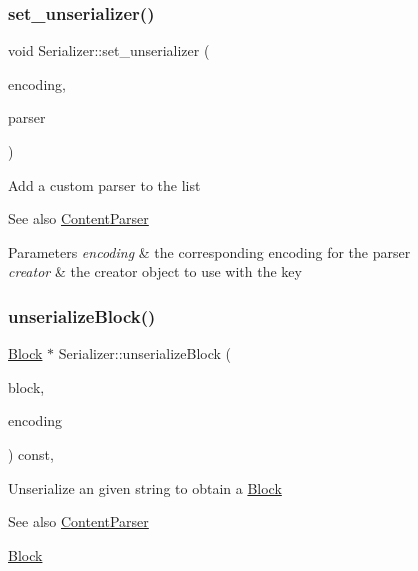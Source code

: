 \subsubsection{\texorpdfstring{set\+\_\+unserializer()}{set\_unserializer()}}
{\footnotesize\ttfamily void Serializer\+::set\+\_\+unserializer (\begin{DoxyParamCaption}\item[{const char $\ast$}]{encoding,  }\item[{\mbox{\hyperlink{classContentParser}{Content\+Parser}} $\ast$}]{parser }\end{DoxyParamCaption})\hspace{0.3cm}{\ttfamily [inherited]}}

Add a custom parser to the list \begin{DoxySeeAlso}{See also}
\mbox{\hyperlink{classContentParser}{Content\+Parser}}
\end{DoxySeeAlso}

\begin{DoxyParams}{Parameters}
{\em encoding} & the corresponding encoding for the parser \\
\hline
{\em creator} & the creator object to use with the key \\
\hline
\end{DoxyParams}
\mbox{\label{classSerializer_a423fb7c43ca9c23e07000dba0c5a432a}} 
\subsubsection{\texorpdfstring{unserialize\+Block()}{unserializeBlock()}}
{\footnotesize\ttfamily \mbox{\hyperlink{classBlock}{Block}} $\ast$ Serializer\+::unserialize\+Block (\begin{DoxyParamCaption}\item[{std\+::string}]{block,  }\item[{const char $\ast$}]{encoding }\end{DoxyParamCaption}) const\hspace{0.3cm}{\ttfamily [virtual]}, {\ttfamily [inherited]}}

Unserialize an given string to obtain a \mbox{\hyperlink{classBlock}{Block}} \begin{DoxySeeAlso}{See also}
\mbox{\hyperlink{classContentParser}{Content\+Parser}} 

\mbox{\hyperlink{classBlock}{Block}}
\end{DoxySeeAlso}

